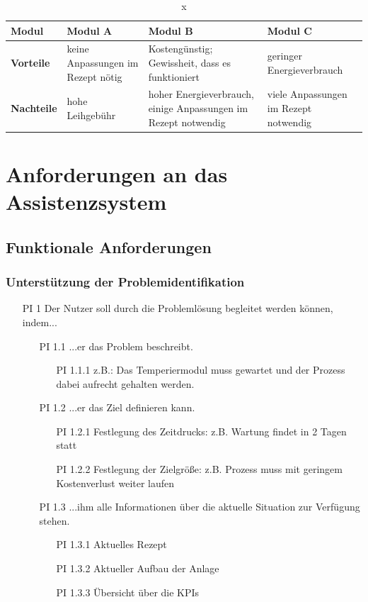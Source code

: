 \begin{table}[htbp]
\centering
\begin{tabular}{|p{}|p{}|p{}|p{}|}
\hline
\textbf{Modul} & Modul A & Modul B & Modul C \\
\hline
\textbf{Vorteile} & keine Anpassungen im Rezept nötig & Kostengünstig; Gewissheit, dass es funktioniert & geringer Energieverbrauch \\
\hline
\textbf{Nachteile} & hohe Leihgebühr & hoher Energieverbrauch, einige Anpassungen im Rezept notwendig & viele Anpassungen im Rezept notwendig \\
\hline
\end{tabular}
\caption{x}
\label{tab:}
\end{table}

\section{Anforderungen an das Assistenzsystem}

\subsection{Funktionale Anforderungen}

\subsubsection*{Unterstützung der Problemidentifikation}
\begin{itemize}
\item[PI 1] Der Nutzer soll durch die Problemlösung begleitet werden können, indem...
	\begin{itemize}
	\item[PI 1.1] ...er das Problem beschreibt.
		\begin{itemize}
		\item[PI 1.1.1] z.B.: Das Temperiermodul muss gewartet und der Prozess dabei aufrecht gehalten werden.
		\end{itemize}
	\end{itemize}
	\begin{itemize}
	\item [PI 1.2] ...er das Ziel definieren kann.
		\begin{itemize}
		\item[PI 1.2.1] Festlegung des Zeitdrucks: z.B. Wartung findet in 2 Tagen statt
		\item[PI 1.2.2] Festlegung der Zielgröße: z.B. Prozess muss mit geringem Kostenverlust weiter laufen
		\end{itemize}
	\item[PI 1.3] ...ihm alle Informationen über die aktuelle Situation zur Verfügung stehen.
		\begin{itemize}
		\item[PI 1.3.1] Aktuelles Rezept
		\item[PI 1.3.2] Aktueller Aufbau der Anlage
		\item[PI 1.3.3] Übersicht über die KPIs
		\end{itemize}
	\end{itemize}
\end{itemize}

